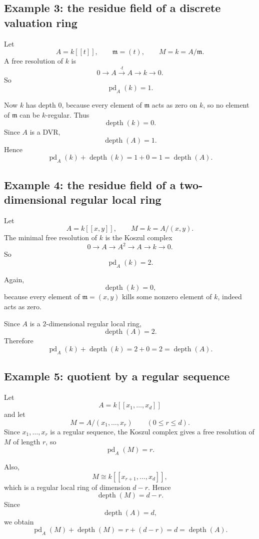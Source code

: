 \documentclass[12pt,a4paper]{article}
\theoremstyle{notespace}
\begin{document}
\subsection{Example 3: the residue field of a discrete valuation ring}

Let
\[
A=k[[t]],
\qquad
\mathfrak m=(t),
\qquad
M=k=A/\mathfrak m.
\]
A free resolution of \(k\) is
\[
0 \longrightarrow A \xrightarrow{\cdot t} A \longrightarrow k \longrightarrow 0.
\]
So
\[
\operatorname{pd}_A(k)=1.
\]

Now \(k\) has depth \(0\), because every element of \(\mathfrak m\) acts as zero on \(k\), so no element of \(\mathfrak m\) can be \(k\)-regular. Thus
\[
\operatorname{depth}(k)=0.
\]
Since \(A\) is a DVR,
\[
\operatorname{depth}(A)=1.
\]
Hence
\[
\operatorname{pd}_A(k)+\operatorname{depth}(k)=1+0=1=\operatorname{depth}(A).
\]

\subsection{Example 4: the residue field of a two-dimensional regular local ring}

Let
\[
A=k[[x,y]],
\qquad
M=k=A/(x,y).
\]
The minimal free resolution of \(k\) is the Koszul complex
\[
0 \longrightarrow A \longrightarrow A^2 \longrightarrow A \longrightarrow k \longrightarrow 0.
\]
So
\[
\operatorname{pd}_A(k)=2.
\]

Again,
\[
\operatorname{depth}(k)=0,
\]
because every element of \(\mathfrak m=(x,y)\) kills some nonzero element of \(k\), indeed acts as zero.

Since \(A\) is a \(2\)-dimensional regular local ring,
\[
\operatorname{depth}(A)=2.
\]
Therefore
\[
\operatorname{pd}_A(k)+\operatorname{depth}(k)=2+0=2=\operatorname{depth}(A).
\]

\subsection{Example 5: quotient by a regular sequence}

Let
\[
A=k[[x_1,\dots,x_d]]
\]
and let
\[
M=A/(x_1,\dots,x_r)
\qquad (0\le r\le d).
\]
Since \(x_1,\dots,x_r\) is a regular sequence, the Koszul complex gives a free resolution of \(M\) of length \(r\), so
\[
\operatorname{pd}_A(M)=r.
\]

Also,
\[
M\cong k[[x_{r+1},\dots,x_d]],
\]
which is a regular local ring of dimension \(d-r\). Hence
\[
\operatorname{depth}(M)=d-r.
\]
Since
\[
\operatorname{depth}(A)=d,
\]
we obtain
\[
\operatorname{pd}_A(M)+\operatorname{depth}(M)
=
r+(d-r)
=
d
=
\operatorname{depth}(A).
\]
\end{document}

